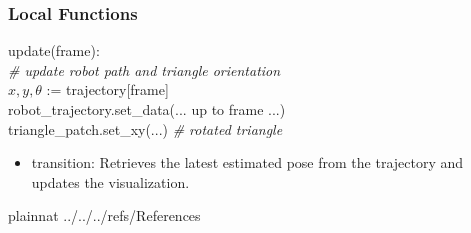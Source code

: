 \documentclass[12pt, titlepage]{article}
\begin{document}
\subsubsection{Local Functions}
\noindent update(frame):\\
\noindent \textit{\# update robot path and triangle orientation} \\
$x, y, \theta$ := trajectory[frame] \\
robot\_trajectory.set\_data(... up to frame ...) \\
triangle\_patch.set\_xy(...) \textit{\# rotated triangle}

\begin{itemize}
    \item transition: Retrieves the latest estimated pose from the trajectory and updates the visualization.
\end{itemize}

\newpage


 {plainnat}
 {../../../refs/References}






\end{document}
